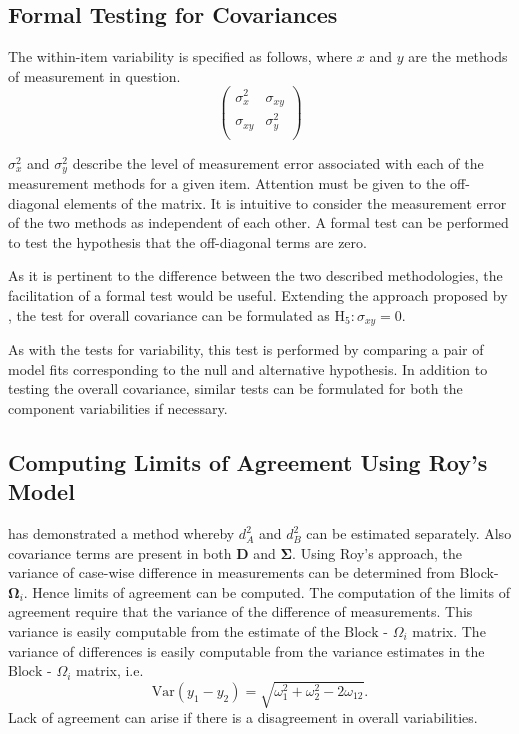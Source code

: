 \documentclass[12pt, a4paper]{report}
\theoremstyle{plain}
\theoremstyle{definition}
\theoremstyle{remark}
\begin{document}
\subsection{Formal Testing for Covariances} %

The within-item variability is specified as follows, where $x$ and $y$ are the methods of measurement in question.
\[ \left(
\begin{array}{cc}
\sigma^2_x & \sigma_{xy} \\
\sigma_{xy} & \sigma^2_y \\
\end{array}
\right)
\]

$\sigma^2_x$ and $\sigma^2_y$ describe the level of measurement error associated with each of the measurement methods for a given item. Attention must be given to the off-diagonal elements of the matrix. It is intuitive to consider the measurement error of the two methods as independent of each other. A formal test can be performed to test the hypothesis that the off-diagonal terms are zero.


As it is pertinent to the difference between the two described methodologies, the facilitation of a formal test would be useful. Extending the approach proposed by \citet{ARoy2009}, the test for overall covariance can be formulated as $\operatorname{H_5} : \sigma_{xy} = 0$.

As with the tests for variability, this test is performed by comparing a pair of model fits corresponding to the null and alternative hypothesis. In addition to testing the overall covariance, similar tests can be formulated for both the component variabilities if necessary.



\subsection{Computing Limits of Agreement Using Roy's Model}
\citet{ARoy2009} has demonstrated a method whereby $d^2_{A}$ and $d^2_{B}$ can be estimated separately. Also covariance terms are present in both $\boldsymbol{D}$ and $\boldsymbol{\Sigma}$. Using Roy's approach, the variance of case-wise difference in measurements can be determined from Block-$\boldsymbol{\Omega}_{i}$. Hence limits of agreement can be computed. The computation of the limits of agreement require that the variance of the difference of measurements. This variance is easily computable from the estimate of the ${\mbox{Block - } \Omega_{i}}$ matrix.
The variance of differences is easily computable from the variance estimates in the ${\mbox{Block - } \Omega_{i}}$ matrix, i.e.
\begin{equation}
\mathrm{Var}(y_1 - y_2) = \sqrt{ \omega^2_1 + \omega^2_2 - 2\omega_{12}}.
\label{Roy-LOA}
\end{equation}
Lack of agreement can arise if there is a disagreement in overall variabilities.
\end{document}
